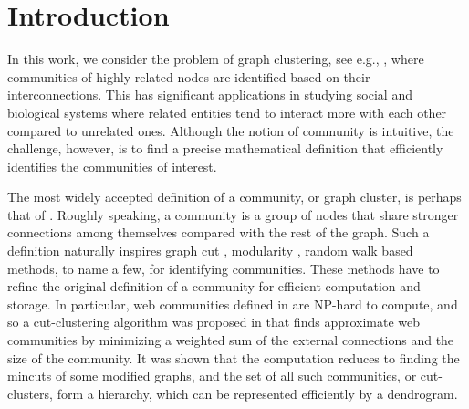 
\section{Introduction}
\label{sec:introduction}


In this work, we consider the problem of graph clustering, see e.g., \cite{fortunato2016community}, where communities of highly related nodes
are identified based on their interconnections. This has significant applications in studying social
and biological systems where related entities tend to interact more with each other compared to
unrelated ones.
Although the notion of community is
intuitive, the challenge, however, is to find a precise mathematical definition that efficiently
identifies the communities of interest.

The most widely accepted definition of a community, or graph cluster, is perhaps that of
\cite{flake:efficient,radicchi:defining,newman2004fast}. Roughly speaking, a community
is a group of nodes  that share
stronger connections among themselves compared with the rest of the graph. Such a definition naturally inspires
 graph cut \cite{flake:cut-clustering,shi2000normalized},
modularity \cite{newman2004fast,blondel2008fast}, random walk \cite{rosvall2008maps} based
methods, to name a few, for identifying communities. These methods have to refine the original
definition of a community for efficient computation and storage. In particular, web communities
defined in \cite{flake:efficient,flake:cut-clustering} are NP-hard to compute, and so a
cut-clustering algorithm was proposed in \cite{flake:cut-clustering} that finds approximate web
communities by minimizing a weighted sum of the external connections and the size of the community.
It was shown that the computation reduces to finding the mincuts of some modified graphs,  and the
set of all such communities, or cut-clusters, form a hierarchy, which can be represented efficiently
by a dendrogram.


